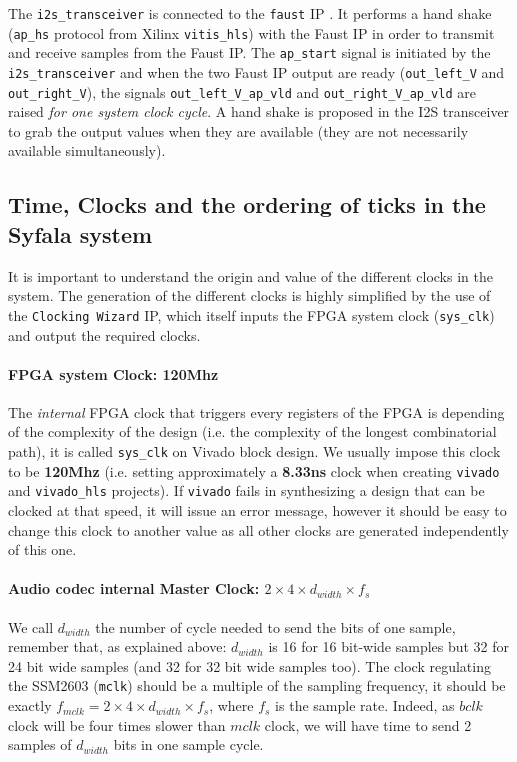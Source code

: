 \documentclass[11pt]{article}
\numberwithin{equation}{section}
\numberwithin{figure}{section}
\begin{document}
The {\tt i2s\_transceiver} is connected to the {\tt faust} IP . It performs a hand shake ({\tt ap\_hs} protocol from Xilinx {\tt vitis\_hls}) with the Faust IP in order to transmit and receive samples from the Faust IP. The {\tt ap\_start} signal is initiated by the {\tt i2s\_transceiver} and when the two Faust IP output are ready ({\tt out\_left\_V} and {\tt out\_right\_V}), the signals {\tt out\_left\_V\_ap\_vld} and {\tt out\_right\_V\_ap\_vld} are raised {\em for one system clock cycle}. A hand shake is proposed in the I2S transceiver to grab the output values when they are available (they are not necessarily available simultaneously). 


\subsection{Time, Clocks and the ordering of ticks in the Syfala system}

It is important to understand the origin and value of the different clocks in the system. The generation of the different clocks is highly simplified by the use of the {\tt Clocking Wizard} IP, which itself inputs the FPGA system clock ({\tt sys\_clk}) and output the required clocks.  
\paragraph{FPGA system Clock: 120Mhz}
The {\em internal} FPGA clock that triggers every registers of the FPGA is depending of the complexity of the design (i.e. the complexity of the longest combinatorial path), it is called {\tt sys\_clk} on Vivado block design. We usually impose this clock to be {\bf 120Mhz} (i.e. setting approximately a {\bf 8.33ns} clock when creating {\tt vivado} and {\tt vivado\_hls} projects). If {\tt vivado} fails in synthesizing a design that can be clocked at that speed, it will issue an error message, however it should be easy to change this clock to another value as all other clocks are generated independently of this one.

\paragraph{Audio codec internal Master Clock: $ 2\times 4 \times d_{width}\times f_s$}
We call $d_{width}$ the number of cycle needed to send the bits of one sample,  remember that, as explained above: $d_{width}$ is 16 for 16 bit-wide samples but 32 for 24 bit wide samples (and 32 for 32 bit wide samples too).   
The clock regulating the SSM2603 ({\tt mclk}) should be a multiple of the sampling frequency, it should be exactly $f_{mclk}=2\times 4\times d_{width}\times f_s$, where $f_s$ is the sample rate. Indeed, as $bclk$ clock will be four times  slower than $mclk$ clock, we will have time to send 2 samples of $d_{width}$ bits in one sample cycle. 
\end{document}
